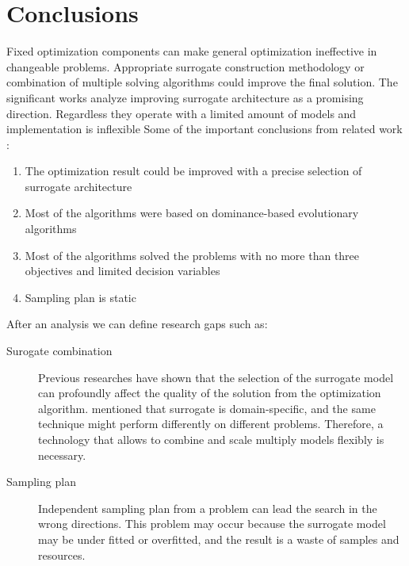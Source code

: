     \section{Conclusions}

        Fixed optimization components can make general optimization ineffective in changeable problems. Appropriate surrogate construction methodology or combination of multiple solving algorithms could improve the final solution. The significant works analyze improving surrogate architecture as a promising direction. Regardless they operate with a limited amount of models and implementation is inflexible
        Some of the important conclusions from related work \cite{SoftSurvey}:
        \begin{enumerate}
            \item The optimization result could be improved with a precise selection of surrogate architecture
            \item Most of the algorithms were based on dominance-based evolutionary algorithms
            \item Most of the algorithms solved the problems with no more than three objectives and limited decision variables
            \item Sampling plan is static
        \end{enumerate}


        After an analysis we can define research gaps such as:
        \begin{description}
            \item[Surogate combination] Previous researches have shown that the selection of the surrogate model can profoundly affect the quality of the solution from the optimization algorithm. \cite{LuST19} mentioned that surrogate is domain-specific, and the same technique might perform differently on different problems. Therefore, a technology that allows to combine and scale multiply models flexibly is necessary.
            \item[Sampling plan] Independent sampling plan from a problem can lead the search in the wrong directions. This problem may occur because the surrogate model may be under fitted or overfitted, and the result is a waste of samples and resources.
        \end{description}


